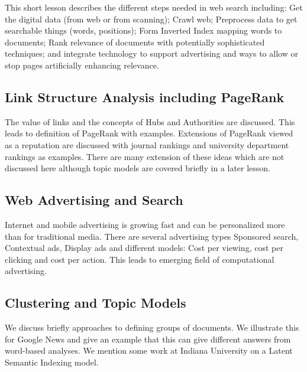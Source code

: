 This short lesson describes the different steps needed in web search
including: Get the digital data (from web or from scanning); Crawl web;
Preprocess data to get searchable things (words, positions); Form
Inverted Index mapping words to documents; Rank relevance of documents
with potentially sophisticated techniques; and integrate technology to
support advertising and ways to allow or stop pages artificially
enhancing relevance.




\subsection{Link Structure Analysis including PageRank}


The value of links and the concepts of Hubs and Authorities are
discussed. This leads to definition of PageRank with examples.
Extensions of PageRank viewed as a reputation are discussed with journal
rankings and university department rankings as examples. There are many
extension of these ideas which are not discussed here although topic
models are covered briefly in a later lesson.



\subsection{Web Advertising and Search}


Internet and mobile advertising is growing fast and can be personalized
more than for traditional media. There are several advertising types
Sponsored search, Contextual ads, Display ads and different models: Cost
per viewing, cost per clicking and cost per action. This leads to
emerging field of computational advertising.




\subsection{Clustering and Topic Models}


We discuss briefly approaches to defining groups of documents. We
illustrate this for Google News and give an example that this can give
different answers from word-based analyses. We mention some work at
Indiana University on a Latent Semantic Indexing model.

